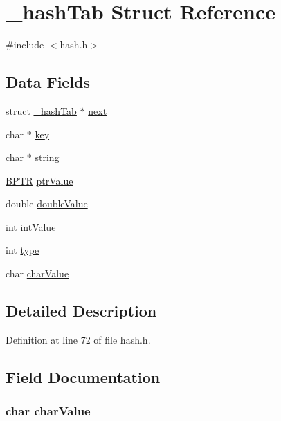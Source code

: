 \hypertarget{struct__hash_tab}{\section{\-\_\-hash\-Tab Struct Reference}
\label{struct__hash_tab}
}


{\ttfamily \#include $<$hash.\-h$>$}

\subsection*{Data Fields}
\begin{DoxyCompactItemize}
\item 
struct \hyperlink{struct__hash_tab}{\-\_\-hash\-Tab} $\ast$ \hyperlink{struct__hash_tab_a6b1bf82fb36b767517ec28950b8f888d}{next}
\item 
char $\ast$ \hyperlink{struct__hash_tab_a5892a9181e6a332f84d27aecd41dcd12}{key}
\item 
char $\ast$ \hyperlink{struct__hash_tab_aed1cfb225a5fb77461e7972691e68a72}{string}
\item 
\hyperlink{_sys_defs_8h_aa0ecf453c76647df6ba46466b761e4c7}{B\-P\-T\-R} \hyperlink{struct__hash_tab_a59393e473d6eccef47ff04cc0928f74e}{ptr\-Value}
\item 
double \hyperlink{struct__hash_tab_a7bc845542bdc79ff87d50b7c40a069f2}{double\-Value}
\item 
int \hyperlink{struct__hash_tab_a23b7c31b2f6c188e1c281f7be7473f23}{int\-Value}
\item 
int \hyperlink{struct__hash_tab_ac765329451135abec74c45e1897abf26}{type}
\item 
char \hyperlink{struct__hash_tab_a01105ae44d17bd613d5b961cfc24af57}{char\-Value}
\end{DoxyCompactItemize}


\subsection{Detailed Description}


Definition at line 72 of file hash.\-h.



\subsection{Field Documentation}
\hypertarget{struct__hash_tab_a01105ae44d17bd613d5b961cfc24af57}{
\subsubsection[{char\-Value}]{\setlength{\rightskip}{0pt plus 5cm}char char\-Value}}\label{struct__hash_tab_a01105ae44d17bd613d5b961cfc24af57}



